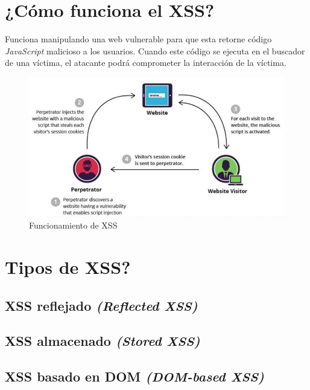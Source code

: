 \documentclass[bibliography=totocnumbered]{scrartcl}
\begin{document}
\section{¿Cómo funciona el XSS?}
Funciona manipulando una web vulnerable para que esta retorne código \textit{JavaScript} malicioso a los usuarios. Cuando este código se ejecuta en el buscador de una víctima, el atacante podrá comprometer la interacción de la víctima.
\begin{figure}[h]
  \includegraphics[width=\linewidth]{figures/xssStored.jpg}
  \caption{Funcionamiento de XSS}
  \label{fig:XssStored}
\end{figure}

\section{Tipos de XSS?}
\subsection{XSS reflejado \textit{(Reflected XSS)}}

\subsection{XSS almacenado \textit{(Stored XSS)}}

\subsection{XSS basado en DOM \textit{(DOM-based XSS)}}


\newpage
\nocite{*}
\printbibliography 
\end{document}

